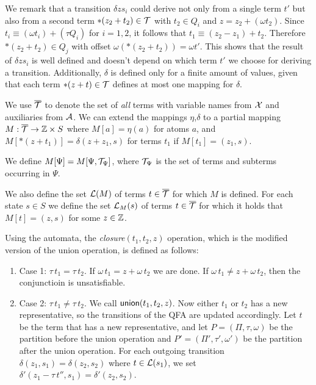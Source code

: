 We remark that a transition $\delta z s_i$ could derive not only from a single term $t'$ but also from a second term $*(z_2 + t_2) \in \mathcal{T}$ with $t_2 \in Q_i$ and $z = z_2 + (\omega t_2)$.
Since $t_i \equiv (\omega t_i) + (\tau Q_i)$ for $i = 1,2$, it follows that $t_1 \equiv (z_2 - z_1)+ t_2$. Therefore $*(z_2+t_2)\in Q_j$ with offset $\omega(*(z_2+t_2)) = \omega t'$.
This shows that the result of $\delta z s_i$ is well defined and doesn't depend on which term $t'$ we choose for deriving a transition.
Additionally, $\delta$ is defined only for a finite amount of values, given that each term $*(z + t) \in \mathcal{T}$ defines at most one mapping for $\delta$.

We use ${\overline{\mathcal{T}}}$ to denote the set of \emph{all} terms with variable names from $\mathcal{X}$ and auxiliaries from $\mathcal{A}$.
We can extend the mappings $\eta$,$\delta$ to a partial mapping $M : {\overline{\mathcal{T}}} \rightarrow \mathbb{Z} \times S$ where $M[a] = \eta(a)$ for atoms $a$, and $M[*(z+t_1)] = \delta(z+z_1, s)$ for terms $t_1$ if $M[t_1] = (z_1,s)$.

We define $M[\Psi] = M[\Psi,\mathcal{T}_\Psi]$, where $\mathcal{T}_\Psi$ is the set of terms and subterms occurring in $\Psi$.

We also define the set $\mathcal{L}(M)$ of terms $t \in {\overline{\mathcal{T}}}$ for which $M$ is defined.
For each state $s \in S$ we define the set $\mathcal{L}_M(s)$ of terms $t \in {\overline{\mathcal{T}}}$ for which it holds that $M[t] = (z, s)$ for some $z \in \mathbb{Z}$.

Using the automata, the \emph{closure}$(t_1,t_2,z)$ operation, which is the modified version of the union operation, is defined as follows:

\begin{enumerate}
  \item Case 1: $\tau\,t_1 = \tau\,t_2$. If $\omega\,t_1 = z + \omega\,t_2$ we are done.
  If $\omega\,t_1 \neq z + \omega\,t_2$, then the conjunctioin is unsatisfiable.
  \item Case 2: $\tau\,t_1 \neq \tau\,t_2$. We call $\textsf{union}(t_1, t_2, z)$.
  Now either $t_1$ or $t_2$ has a new representative, so the transitions of the QFA are updated accordingly.
  Let $t$ be the term that has a new representative,
  and let $P = (\Pi, \tau, \omega)$ be the partition before the union operation and $P' = (\Pi', \tau', \omega')$ be the partition after the union operation.
  For each outgoing transition $\delta(z_1, s_1) = \delta(z_2, s_2)$ where $t \in \mathcal{L}(s_1)$,
  we set $\delta'(z_1 - \tau\,t'', s_1) = \delta'(z_2, s_2)$.
\end{enumerate}

